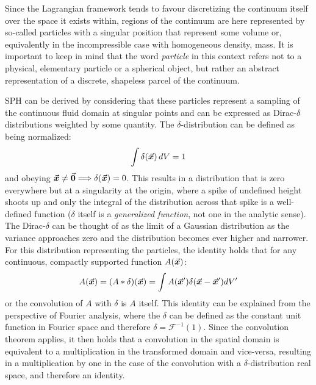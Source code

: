 Since the Lagrangian framework tends to favour discretizing the continuum itself over the space it exists within, regions of the continuum are here represented by so-called particles with a singular position that represent some volume or, equivalently in the incompressible case with homogeneous density, mass. It is important to keep in mind that the word \textit{particle} in this context refers not to a physical, elementary particle or a spherical object, but rather an abstract representation of a discrete, shapeless parcel of the continuum.

SPH can be derived by considering that these particles represent a sampling of the continuous fluid domain at singular points and can be expressed as Dirac-$\delta$ distributions weighted by some quantity. The $\delta$-distribution can be defined as being normalized:
\begin{equation}
  \int \delta(\vec{\bm{x}}) \,dV = 1
\end{equation}
and obeying $\vec{\bm{x}}\neq \vec{\bm{0}} \Longrightarrow \delta(\vec{\bm{x}}) = 0$. This results in a distribution that is zero everywhere but at a singularity at the origin, where a spike of undefined height shoots up and only the integral of the distribution across that spike is a well-defined function ($\delta$ itself is a \textit{generalized function}, not one in the analytic sense\autocite*{signal-processing-falaschi}). The Dirac-$\delta$ can be thought of as the limit of a Gaussian distribution as the variance approaches zero and the distribution becomes ever higher and narrower\autocite{tutorial}.\\
For this distribution representing the particles, the identity holds that for any continuous, compactly supported function $A(\vec{\bm{x}})$\autocite{tutorial}:
\begin{equation}\label{eq:conv-identity}
  A(\vec{\bm{x}}) = (A * \delta)(\vec{\bm{x}}) = \int A(\vec{\bm{x}}') \delta(\vec{\bm{x}}-\vec{\bm{x}}')dV'
\end{equation}
or the convolution of $A$ with $\delta$ is $A$ itself. This identity can be explained from the perspective of Fourier analysis, where the $\delta$ can be defined as the constant unit function in Fourier space and therefore $\delta = \mathcal{F}^{-1}(1)$. Since the convolution theorem applies, it then holds that a convolution in the spatial domain is equivalent to a multiplication in the transformed domain and vice-versa, resulting in a multiplication by one in the case of the convolution with a $\delta$-distribution real space, and therefore an identity.

